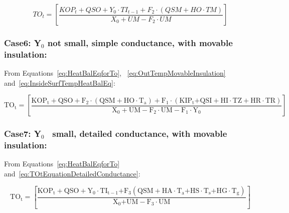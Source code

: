 \begin{equation}
TO_t = \left[ \frac{ KOP_t + QSO + Y_0 \cdot {TI_{t-1}} + F_2 \cdot \left( QSM + HO \cdot TM \right) } { X_0 + UM - F_2 \cdot UM } \right]
\label{eq:HeatBalanceEquationCase5}
\end{equation}

\subsubsection{Case6: Y\(_{0}\) not small, simple conductance, with movable insulation:}\label{case6-yux5f0-not-small-simple-conductance-with-movable-insulation}

From Equations~\ref{eq:HeatBalEqforTo}, ~\ref{eq:OutTempMovableInsulation} and~\ref{eq:InsideSurfTempHeatBalEq}:

\begin{equation}
{\mathrm{T}}{{\mathrm{O}}_{\mathrm{t}}}{\mathrm{ = }}\left[ {\frac{{{\mathrm{KO}}{{\mathrm{P}}_{\mathrm{t}}} + {\mathrm{QSO}} + {{\mathrm{F}}_2}\cdot \left( {{\mathrm{QSM + HO}}\cdot {{\mathrm{T}}_{\mathrm{a}}}} \right) + {{\mathrm{F}}_1}\cdot \left( {{\mathrm{KI}}{{\mathrm{P}}_{\mathrm{t}}}{\mathrm{ + QSI + HI}}\cdot {\mathrm{TZ + HR}}\cdot {\mathrm{TR}}} \right)}}{{{{\mathrm{X}}_{\mathrm{0}}} + {\mathrm{UM - }}{{\mathrm{F}}_{\mathrm{2}}}\cdot {\mathrm{UM - }}{{\mathrm{F}}_{\mathrm{1}}}\cdot {{\mathrm{Y}}_{\mathrm{0}}}}}} \right]{\mathrm{  }}
\label{eq:HeatBalanceEquationCase6}
\end{equation}

\subsubsection{Case7: Y\(_{0}\)~ small, detailed conductance, with movable insulation:}\label{case7-yux5f0-small-detailed-conductance-with-movable-insulation}

From Equations~\ref{eq:HeatBalEqforTo} and~\ref{eq:TOtEquationDetailedConductance}:

\begin{equation}
{\mathrm{T}}{{\mathrm{O}}_{\mathrm{t}}}{\mathrm{ = }}\left[ {\frac{{{\mathrm{KO}}{{\mathrm{P}}_{\mathrm{t}}} + {\mathrm{QSO}} + {{\mathrm{Y}}_0}\cdot {\mathrm{T}}{{\mathrm{I}}_{{\mathrm{t - 1}}}}{\mathrm{ + }}{{\mathrm{F}}_{\mathrm{3}}}\left( {{\mathrm{QSM + HA}}\cdot {{\mathrm{T}}_{\mathrm{a}}}{\mathrm{ + HS}}\cdot {{\mathrm{T}}_{\mathrm{s}}}{\mathrm{ + HG}}\cdot {{\mathrm{T}}_{\mathrm{g}}}} \right)}}{{{{\mathrm{X}}_{\mathrm{0}}}{\mathrm{ + UM - }}{{\mathrm{F}}_{\mathrm{3}}}\cdot {\mathrm{UM}}}}} \right]{\mathrm{  }}
\label{eq:HeatBalanceEquationCase7}
\end{equation}

